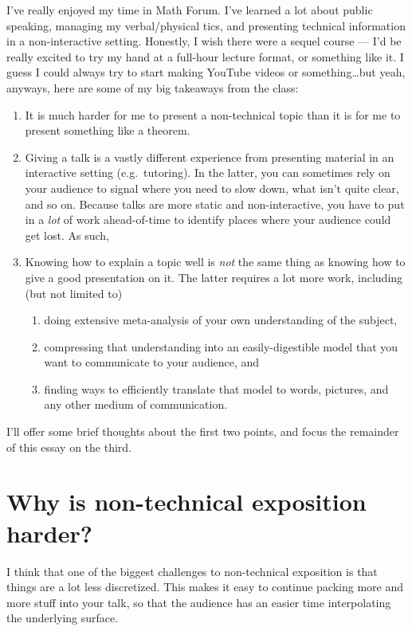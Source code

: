 \documentclass{fkpset}
\begin{document}
\begin{solution}[Response.]
  \setlength{\parindent}{2em}

  I've really enjoyed my time in Math Forum. I've learned a lot about
  public speaking, managing my verbal/physical tics, and presenting
  technical information in a non-interactive setting. Honestly, I wish
  there were a sequel course --- I'd be really excited to try my hand
  at a full-hour lecture format, or something like it. I guess I could
  always try to start making YouTube videos or something\ldots but
  yeah, anyways, here are some of my big takeaways from the class:
  \begin{enumerate}[label=\arabic*)]
    \item It is much harder for me to present a non-technical topic
      than it is for me to present something like a theorem.
    \item Giving a talk is a vastly different experience from
      presenting material in an interactive setting (e.g.\ tutoring).
      In the latter, you can sometimes rely on your audience to signal
      where you need to slow down, what isn't quite clear, and so on.
      Because talks are more static and non-interactive, you have to
      put in a \emph{lot} of work ahead-of-time to identify places
      where your audience could get lost. As such,
    \item Knowing how to explain a topic well is \emph{not} the same
      thing as knowing how to give a good presentation on it. The
      latter requires a lot more work, including (but not limited to)
      \begin{enumerate}
        \item doing extensive meta-analysis of your own understanding
          of the subject,
        \item compressing that understanding into an easily-digestible
          model that you want to communicate to your audience, and
        \item finding ways to efficiently translate that model to
          words, pictures, and any other medium of communication.
      \end{enumerate}
  \end{enumerate}
  I'll offer some brief thoughts about the first two points, and focus
  the remainder of this essay on the third.
  \section{Why is non-technical exposition harder?}
  I think that one of the biggest challenges to non-technical
  exposition is that things are a lot less discretized. This makes it
  easy to continue packing more and more stuff into your talk, so that
  the audience has an easier time interpolating the underlying
  surface.


\end{solution}
\end{document}
